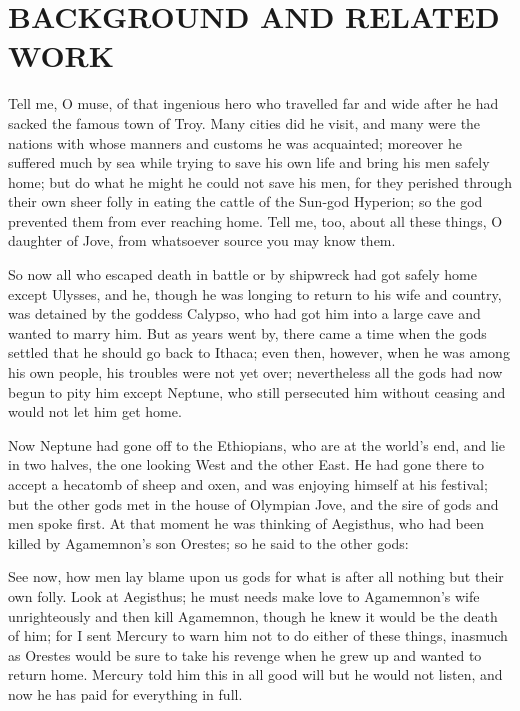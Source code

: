 \chapter{BACKGROUND AND RELATED WORK}
Tell me, O muse, of that ingenious hero who travelled far and wide after he had sacked the famous town of Troy. Many cities did he visit, and many were the nations with whose manners and customs he was acquainted; moreover he suffered much by sea while trying to save his own life and bring his men safely home; but do what he might he could not save his men, for they perished through their own sheer folly in eating the cattle of the Sun-god Hyperion; so the god prevented them from ever reaching home. Tell me, too, about all these things, O daughter of Jove, from whatsoever source you may know them.

So now all who escaped death in battle or by shipwreck had got safely home except Ulysses, and he, though he was longing to return to his wife and country, was detained by the goddess Calypso, who had got him into a large cave and wanted to marry him. But as years went by, there came a time when the gods settled that he should go back to Ithaca; even then, however, when he was among his own people, his troubles were not yet over; nevertheless all the gods had now begun to pity him except Neptune, who still persecuted him without ceasing and would not let him get home.

Now Neptune had gone off to the Ethiopians, who are at the world's end, and lie in two halves, the one looking West and the other East. He had gone there to accept a hecatomb of sheep and oxen, and was enjoying himself at his festival; but the other gods met in the house of Olympian Jove, and the sire of gods and men spoke first. At that moment he was thinking of Aegisthus, who had been killed by Agamemnon's son Orestes; so he said to the other gods:

See now, how men lay blame upon us gods for what is after all nothing but their own folly. Look at Aegisthus; he must needs make love to Agamemnon's wife unrighteously and then kill Agamemnon, though he knew it would be the death of him; for I sent Mercury to warn him not to do either of these things, inasmuch as Orestes would be sure to take his revenge when he grew up and wanted to return home. Mercury told him this in all good will but he would not listen, and now he has paid for everything in full.

